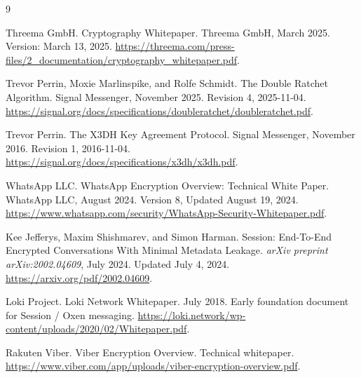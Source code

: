 \documentclass{article}
\begin{document}
\begin{thebibliography}{9}

Threema GmbH.
\newblock Cryptography Whitepaper.
\newblock Threema GmbH, March 2025.
\newblock Version: March 13, 2025.
\newblock \url{https://threema.com/press-files/2_documentation/cryptography_whitepaper.pdf}.

Trevor Perrin, Moxie Marlinspike, and Rolfe Schmidt.
\newblock The Double Ratchet Algorithm.
\newblock Signal Messenger, November 2025.
\newblock Revision 4, 2025-11-04.
\newblock \url{https://signal.org/docs/specifications/doubleratchet/doubleratchet.pdf}.

Trevor Perrin.
\newblock The X3DH Key Agreement Protocol.
\newblock Signal Messenger, November 2016.
\newblock Revision 1, 2016-11-04.
\newblock \url{https://signal.org/docs/specifications/x3dh/x3dh.pdf}.

WhatsApp LLC.
\newblock WhatsApp Encryption Overview: Technical White Paper.
\newblock WhatsApp LLC, August 2024.
\newblock Version 8, Updated August 19, 2024.
\newblock \url{https://www.whatsapp.com/security/WhatsApp-Security-Whitepaper.pdf}.

Kee Jefferys, Maxim Shishmarev, and Simon Harman.
\newblock Session: End-To-End Encrypted Conversations With Minimal Metadata Leakage.
\newblock \emph{arXiv preprint arXiv:2002.04609}, July 2024.
\newblock Updated July 4, 2024.
\newblock \url{https://arxiv.org/pdf/2002.04609}.

Loki Project.
\newblock Loki Network Whitepaper.
\newblock July 2018.
\newblock Early foundation document for Session / Oxen messaging.
\newblock \url{https://loki.network/wp-content/uploads/2020/02/Whitepaper.pdf}.

Rakuten Viber.
\newblock Viber Encryption Overview.
\newblock Technical whitepaper.
\newblock \url{https://www.viber.com/app/uploads/viber-encryption-overview.pdf}.

\end{thebibliography}
\end{document}
